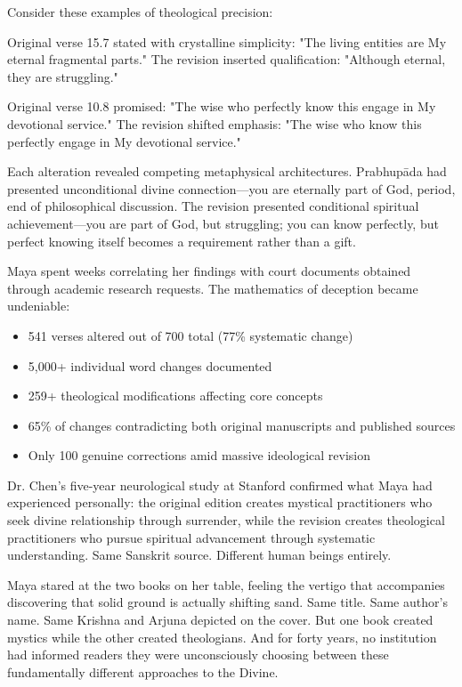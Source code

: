 \documentclass[11pt,twoside]{book}
\begin{document}
Consider these examples of theological precision:

Original verse 15.7 stated with crystalline simplicity: "The living entities are My eternal fragmental parts."
The revision inserted qualification: "Although eternal, they are struggling."

Original verse 10.8 promised: "The wise who perfectly know this engage in My devotional service."  
The revision shifted emphasis: "The wise who know this perfectly engage in My devotional service."

Each alteration revealed competing metaphysical architectures. Prabhupāda had presented unconditional divine connection—you are eternally part of God, period, end of philosophical discussion. The revision presented conditional spiritual achievement—you are part of God, but struggling; you can know perfectly, but perfect knowing itself becomes a requirement rather than a gift.

Maya spent weeks correlating her findings with court documents obtained through academic research requests. The mathematics of deception became undeniable:

\begin{itemize}
\item 541 verses altered out of 700 total (77\% systematic change)
\item 5,000+ individual word changes documented
\item 259+ theological modifications affecting core concepts
\item 65\% of changes contradicting both original manuscripts and published sources
\item Only 100 genuine corrections amid massive ideological revision
\end{itemize}

Dr. Chen's five-year neurological study at Stanford confirmed what Maya had experienced personally: the original edition creates mystical practitioners who seek divine relationship through surrender, while the revision creates theological practitioners who pursue spiritual advancement through systematic understanding. Same Sanskrit source. Different human beings entirely.

Maya stared at the two books on her table, feeling the vertigo that accompanies discovering that solid ground is actually shifting sand. Same title. Same author's name. Same Krishna and Arjuna depicted on the cover. But one book created mystics while the other created theologians. And for forty years, no institution had informed readers they were unconsciously choosing between these fundamentally different approaches to the Divine.
\end{document}
